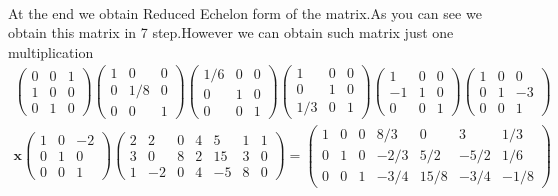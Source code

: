 \documentclass[11pt]{article}
\begin{document}
\paragraph{}At the end we obtain Reduced Echelon form of the matrix.As you can see we obtain this matrix in 7 step.However we can obtain such matrix just one multiplication
\begin{eqnarray*}
\begin{pmatrix}
	0 & 0 & 1 \\
	1 & 0 & 0 \\
	0 & 1 & 0
\end{pmatrix}
\begin{pmatrix}
	1 & 0 & 0 \\
	0 & 1/8 & 0 \\
	0 & 0 & 1
\end{pmatrix}
\begin{pmatrix}
	1/6 & 0 & 0 \\
	0 & 1 & 0 \\
	0 & 0 & 1
\end{pmatrix}
\begin{pmatrix}
	1 & 0 & 0 \\
	0 & 1 & 0 \\
	1/3 & 0 & 1
\end{pmatrix}
\begin{pmatrix}
	1 & 0 & 0 \\
	-1 & 1 & 0 \\
	0 & 0 & 1
\end{pmatrix}
\begin{pmatrix}
	1 & 0 & 0 \\
	0 & 1 & -3 \\
	0 & 0 & 1
\end{pmatrix}
\\ 
\mathbf{x}
\begin{pmatrix}
	1 & 0 & -2 \\
	0 & 1 & 0 \\
	0 & 0 & 1
\end{pmatrix}
\left(\begin{array}{cccccc|c}  
	2 & 2 & 0 & 4 & 5 & 1 & 1\\
    3 & 0 & 8 & 2 & 15 & 3 & 0\\
    1 & -2 & 0 & 4 & -5 & 8 & 0
\end{array}\right)
=
\left(\begin{array}{cccccc|c} 
 	1 & 0 & 0 & 8/3 & 0 & 3 & 1/3\\
	0 & 1 & 0 & -2/3 & 5/2 & -5/2 & 1/6\\
    0 & 0 & 1 & -3/4 & 15/8 & -3/4 & -1/8
\end{array}\right)
\end{eqnarray*}
\end{document}
